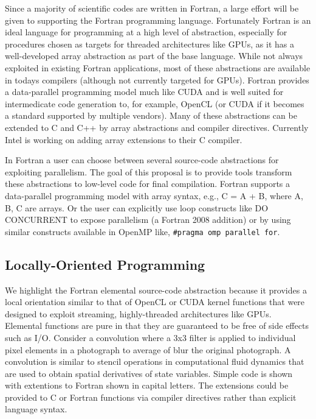 Since a majority of scientific codes are written in Fortran, a large effort will
be given to supporting the Fortran programming language.  Fortunately Fortran is
an ideal language for programming at a high level of abstraction, especially for
procedures chosen as targets for threaded architectures like GPUs, as it has a
well-developed array abstraction as part of the base language.  While not always
exploited in existing Fortran applications, most of these abstractions are
available in todays compilers (although not currently targeted for GPUs).
Fortran provides a data-parallel programming model much like CUDA and is well
suited for intermedicate code generation to, for example, OpenCL (or CUDA if it
becomes a standard supported by multiple vendors).  Many of these abstractions
can be extended to C and C++ by array abstractions and compiler directives.
Currently Intel is working on adding array extensions to their C compiler.

In Fortran a user can choose between several source-code abstractions for
exploiting parallelism.  The goal of this proposal is to provide tools transform
these abstractions to low-level code for final compilation.  Fortran supports a
data-parallel programming model with array syntax, e.g., C = A + B, where A, B,
C are arrays.  Or the user can explicitly use loop constructs like DO CONCURRENT
to expose parallelism (a Fortran 2008 addition) or by using similar constructs
available in OpenMP like, {\tt \#pragma omp parallel for}.

\subsection{Locally-Oriented Programming}

We highlight the Fortran elemental source-code abstraction because it provides a
local orientation similar to that of OpenCL or CUDA kernel functions that were
designed to exploit streaming, highly-threaded architectures like GPUs.
Elemental functions are pure in that they are guaranteed to be free of side
effects such as I/O.  Consider a convolution where a 3x3 filter is applied to
individual pixel elements in a photograph to average of blur the original photograph.
A convolution is similar to stencil operations in computational fluid dynamics that
are used to obtain spatial derivatives of state variables.  Simple code is shown
with extentions to Fortran shown in capital letters.  The extensions could be
provided to C or Fortran functions via compiler directives rather than explicit 
language syntax.

